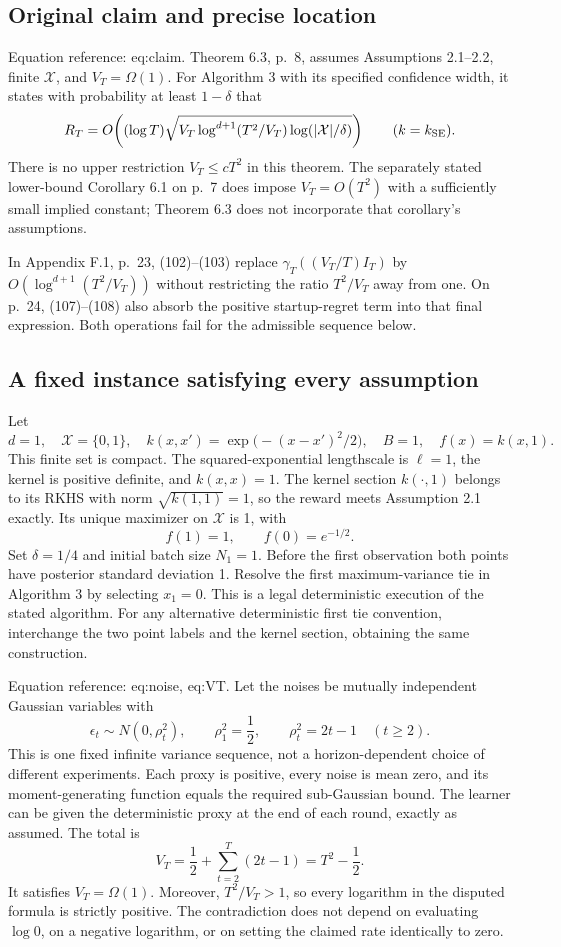 \documentclass[10pt]{article}
\begin{document}
\subsection*{Original claim and precise location}
Equation reference: eq:claim. Theorem 6.3, p. 8, assumes Assumptions 2.1–2.2, finite \(\mathcal X\), and \(V_T=\Omega(1)\). For Algorithm 3 with its specified confidence width, it states with probability at least \(1-\delta\) that \[
 R_T=O\!\left((\log T)
       \sqrt{V_T\log^{d+1}(T^2/V_T)\log(|\mathcal X|/\delta)}\right)
 \qquad(k=k_{\rm SE}).\] There is no upper restriction \(V_T\le cT^2\) in this theorem. The separately stated lower-bound Corollary 6.1 on p. 7 does impose \(V_T=O(T^2)\) with a sufficiently small implied constant; Theorem 6.3 does not incorporate that corollary’s assumptions.\par
In Appendix F.1, p. 23, (102)–(103) replace \(\gamma_T((V_T/T)I_T)\) by \(O(\log^{d+1}(T^2/V_T))\) without restricting the ratio \(T^2/V_T\) away from one. On p. 24, (107)–(108) also absorb the positive startup-regret term into that final expression. Both operations fail for the admissible sequence below.\par
\subsection*{A fixed instance satisfying every assumption}
Let \[d=1,\quad \mathcal X=\{0,1\},\quad
 k(x,x')=\exp\bigl(-(x-x')^2/2\bigr),\quad
 B=1,\quad f(x)=k(x,1).\] This finite set is compact. The squared-exponential lengthscale is \(\ell=1\), the kernel is positive definite, and \(k(x,x)=1\). The kernel section \(k(\cdot,1)\) belongs to its RKHS with norm \(\sqrt{k(1,1)}=1\), so the reward meets Assumption 2.1 exactly. Its unique maximizer on \(\mathcal X\) is 1, with \[f(1)=1,\qquad f(0)=e^{-1/2}.\] Set \(\delta=1/4\) and initial batch size \(N_1=1\). Before the first observation both points have posterior standard deviation 1. Resolve the first maximum-variance tie in Algorithm 3 by selecting \(x_1=0\). This is a legal deterministic execution of the stated algorithm. For any alternative deterministic first tie convention, interchange the two point labels and the kernel section, obtaining the same construction.\par
Equation reference: eq:noise, eq:VT. Let the noises be mutually independent Gaussian variables with \[
 \epsilon_t\sim N(0,\rho_t^2),\qquad
 \rho_1^2=\frac12,\qquad
 \rho_t^2=2t-1\quad(t\ge2).\] This is one fixed infinite variance sequence, not a horizon-dependent choice of different experiments. Each proxy is positive, every noise is mean zero, and its moment-generating function equals the required sub-Gaussian bound. The learner can be given the deterministic proxy at the end of each round, exactly as assumed. The total is \[
 V_T=\frac12+\sum_{t=2}^T(2t-1)=T^2-\frac12.\] It satisfies \(V_T=\Omega(1)\). Moreover, \(T^2/V_T>1\), so every logarithm in the disputed formula is strictly positive. The contradiction does not depend on evaluating \(\log0\), on a negative logarithm, or on setting the claimed rate identically to zero.\par
\end{document}

